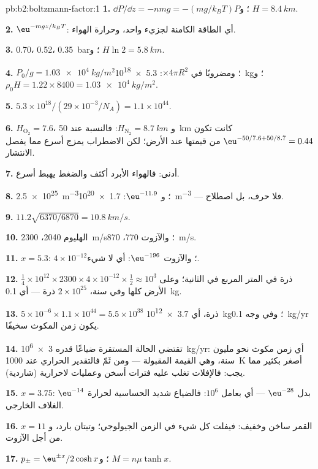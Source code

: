 \begin{solution}{pb:b2:boltzmann-factor:1}
\textbf{1.} $\dd P/\dd z = -nmg = -(mg/k_BT)P$؛ و $H = \qty{8.4}{km}$.

\textbf{2.} $\eu^{-mgz/k_BT}$: أي الطاقة الكامنة لجزيء واحد، وحرارة
الهواء.

\textbf{3.} \qty{0.70}{}، \qty{0.52}{}، \qty{0.35}{bar}؛ و $H\ln 2 = \qty{5.8}{km}$.

\textbf{4.} $P_0/g = \qty{1.03e4}{kg/m^2}$؛ ومضروبًا في $\times 4\pi R^2$: \qty{5.3e18}{kg}؛ و $\rho_0H =
1.22 \times 8400 = \qty{1.03e4}{kg/m^2}$.

\textbf{5.} $5.3 \times 10^{18}/(29 \times 10^{-3}/N_A) = 1.1 \times 10^{44}$.

\textbf{6.} $H_{\text{O}_2} = 7.6$، و $H_{\text{N}_2} = \qty{8.7}{km}$: فالنسبة عند \qty{50}{km}
كانت تكون $\eu^{-50/7.6 + 50/8.7} = 0.44$ من قيمتها عند الأرض؛ لكن الاضطراب يمزج
أسرع مما يفصل الانتشار.

\textbf{7.} أدنى: فالهواء الأبرد أكثف والضغط يهبط أسرع.

\textbf{8.} \qty{2.5e25}{m^{-3}}؛ و $\eu^{-11.9}$: \qty{1.7e20}{m^{-3}} --- فلا حرف، بل
اصطلاح.

\textbf{9.} $11.2\sqrt{6370/6870} = \qty{10.8}{km/s}$.

\textbf{10.} الهليوم \qty{2040}{}، \qty{2300}{m/s}؛ والآزوت \qty{770}{}، \qty{870}{m/s}.

\textbf{11.} $x = 5.3$: $4 \times 10^{-12}$؛ والآزوت $\eu^{-196}$: أي لا شيء.

\textbf{12.} $\tfrac14 \times 10^{12} \times 2300 \times 4 \times 10^{-12} \times \tfrac12 \approx
10^3$ ذرة في المتر المربع في الثانية؛ وعلى الأرض كلها وفي سنة،
$2 \times 10^{25}$ ذرة --- أي \qty{0.1}{kg}.

\textbf{13.} $5 \times 10^{-6} \times 1.1 \times 10^{44} = 5.5 \times 10^{38}$ ذرة، أي \qty{3.7e12}{kg}؛
وفي وجه \qty{0.1}{kg/yr} يكون زمن المكوث سخيفًا.

\textbf{14.} تقتضي الحالة المستقرة ضياعًا قدره \qty{3e6}{kg/yr}: أي زمن
مكوث نحو مليون سنة، وهي القيمة المقبولة --- ومن ثَمّ فالتقدير
الحراري عند \qty{1000}{K} أصغر بكثير مما يجب: فالإفلات
تغلب عليه فترات أسخن وعمليات لاحرارية (شاردية).

\textbf{15.} $x = 3.75$: $\eu^{-14}$ بدل $\eu^{-28}$ --- أي بعامل $10^6$:
فالضياع شديد الحساسية لحرارة الغلاف الخارجي.

\textbf{16.} القمر ساخن وخفيف: فيفلت كل شيء في
الزمن الجيولوجي؛ وتيتان بارد، و $x = 11$ من أجل الآزوت.

\textbf{17.} $p_\pm = \eu^{\pm x}/2\cosh x$؛ و $M = n\mu\tanh x$.


\end{solution}
